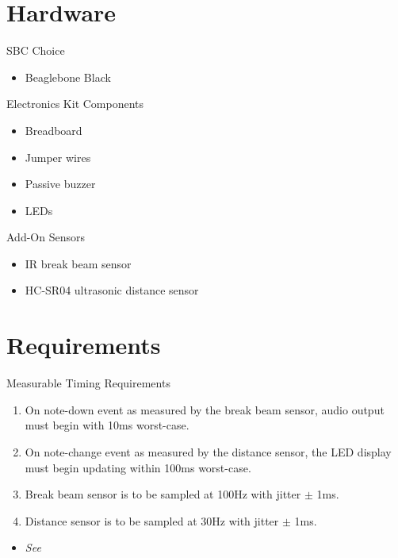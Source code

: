 \documentclass[
11pt,notheorems,hyperref={pdfauthor=whatever}
]{beamer}
\begin{document}
\section{Hardware}
\begin{frame}

\begin{block}{SBC Choice}
\begin{itemize}
    \item Beaglebone Black
\end{itemize}
\end{block}

\begin{block}{Electronics Kit Components}
\begin{itemize}
    \item Breadboard
    \item Jumper wires
    \item Passive buzzer
    \item LEDs
\end{itemize}
\end{block}

\begin{block}{Add-On Sensors}
\begin{itemize}
    \item IR break beam sensor
    \item HC-SR04 ultrasonic distance sensor
\end{itemize}
\end{block}

\end{frame}

\section{Requirements}
\begin{frame}

\begin{block}{Measurable Timing Requirements}
\begin{enumerate}
    \item On note-down event as measured by the break
        beam sensor, audio output must begin
        with 10ms worst-case.
    \item On note-change event as measured by the
        distance sensor, the LED display must begin
        updating within 100ms worst-case.
    \item Break beam sensor is to be sampled at 100Hz
        with jitter $\pm$ 1ms.
    \item Distance sensor is to be sampled at 30Hz
        with jitter $\pm$ 1ms.
\end{enumerate}
\begin{itemize}
    \item \emph{See \cite{wessel_wright_2002}}
\end{itemize}
\end{block}

\end{frame}
\end{document}
